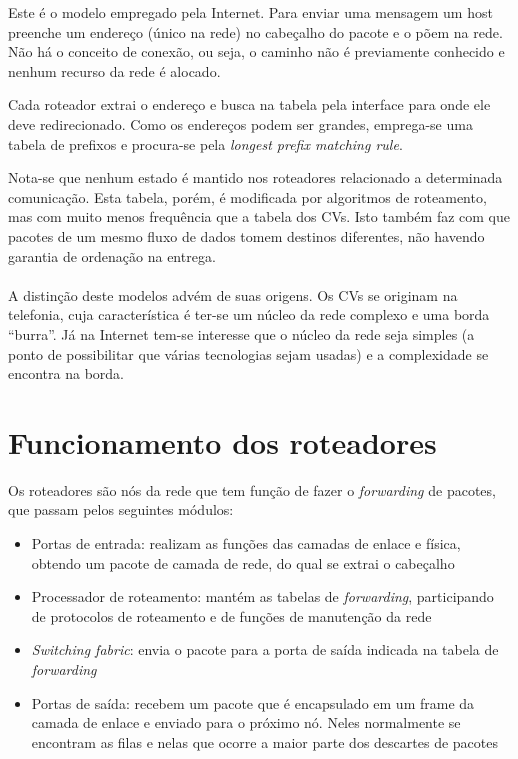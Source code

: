 Este é o modelo empregado pela Internet.
Para enviar uma mensagem um host preenche um endereço (único na rede) no cabeçalho do pacote e o põem na rede.
Não há o conceito de conexão, ou seja, o caminho não é previamente conhecido e nenhum recurso da rede é alocado.

Cada roteador extrai o endereço e busca na tabela pela interface para onde ele deve redirecionado.
Como os endereços podem ser grandes, emprega-se uma tabela de prefixos e procura-se pela \emph{longest prefix matching rule}.

Nota-se que nenhum estado é mantido nos roteadores relacionado a determinada comunicação.
Esta tabela, porém, é modificada por algoritmos de roteamento, mas com muito menos frequência que a tabela dos CVs.
Isto também faz com que pacotes de um mesmo fluxo de dados tomem destinos diferentes, não havendo garantia de ordenação na entrega.

\paragraph{}

A distinção deste modelos advém de suas origens.
Os CVs se originam na telefonia, cuja característica é ter-se um núcleo da rede complexo e uma borda ``burra''.
Já na Internet tem-se interesse que o núcleo da rede seja simples (a ponto de possibilitar que várias tecnologias sejam usadas) e a complexidade se encontra na borda.

\section{Funcionamento dos roteadores}

Os roteadores são nós da rede que tem função de fazer o \emph{forwarding} de pacotes, que passam pelos seguintes módulos:
\begin{itemize}
	\item Portas de entrada: realizam as funções das camadas de enlace e física, obtendo um pacote de camada de rede, do qual se extrai o cabeçalho
	\item Processador de roteamento: mantém as tabelas de \emph{forwarding}, participando de protocolos de roteamento e de funções de manutenção da rede
	\item \emph{Switching fabric}: envia o pacote para a porta de saída indicada na tabela de \emph{forwarding}
	\item Portas de saída: recebem um pacote que é encapsulado em um frame da camada de enlace e enviado para o próximo nó. Neles normalmente se encontram as filas e nelas que ocorre a maior parte dos descartes de pacotes
\end{itemize}

